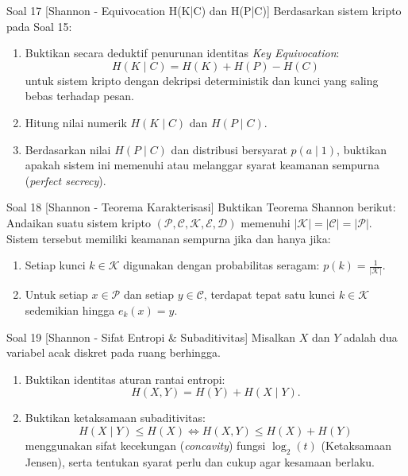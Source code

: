 \documentclass[11pt,a4paper]{article}
\begin{document}
\begin{soalshannon}{Soal 17 [Shannon - Equivocation H(K|C) dan H(P|C)]}
Berdasarkan sistem kripto pada Soal 15:
\begin{enumerate}[label=(\alph*)]
    \item Buktikan secara deduktif penurunan identitas \textit{Key Equivocation}:
    \[
    H(K \mid C) = H(K) + H(P) - H(C)
    \]
    untuk sistem kripto dengan dekripsi deterministik dan kunci yang saling bebas terhadap pesan.
    \item Hitung nilai numerik $H(K \mid C)$ dan $H(P \mid C)$.
    \item Berdasarkan nilai $H(P \mid C)$ dan distribusi bersyarat $p(a \mid 1)$, buktikan apakah sistem ini memenuhi atau melanggar syarat keamanan sempurna (\textit{perfect secrecy}).
\end{enumerate}
\end{soalshannon}

\begin{soalshannon}{Soal 18 [Shannon - Teorema Karakterisasi]}
Buktikan Teorema Shannon berikut:
Andaikan suatu sistem kripto $(\mathcal{P}, \mathcal{C}, \mathcal{K}, \mathcal{E}, \mathcal{D})$ memenuhi $|\mathcal{K}| = |\mathcal{C}| = |\mathcal{P}|$.
Sistem tersebut memiliki keamanan sempurna jika dan hanya jika:
\begin{enumerate}[label=(\arabic*)]
    \item Setiap kunci $k \in \mathcal{K}$ digunakan dengan probabilitas seragam: $p(k) = \frac{1}{|\mathcal{K}|}$.
    \item Untuk setiap $x \in \mathcal{P}$ dan setiap $y \in \mathcal{C}$, terdapat tepat satu kunci $k \in \mathcal{K}$ sedemikian hingga $e_k(x) = y$.
\end{enumerate}
\end{soalshannon}

\begin{soalshannon}{Soal 19 [Shannon - Sifat Entropi \& Subaditivitas]}
Misalkan $X$ dan $Y$ adalah dua variabel acak diskret pada ruang berhingga.
\begin{enumerate}[label=(\alph*)]
    \item Buktikan identitas aturan rantai entropi:
    \[
    H(X, Y) = H(Y) + H(X \mid Y).
    \]
    \item Buktikan ketaksamaan subaditivitas:
    \[
    H(X \mid Y) \le H(X) \iff H(X, Y) \le H(X) + H(Y)
    \]
    menggunakan sifat kecekungan (\textit{concavity}) fungsi $\log_2(t)$ (Ketaksamaan Jensen), serta tentukan syarat perlu dan cukup agar kesamaan berlaku.
\end{enumerate}
\end{soalshannon}
\end{document}
